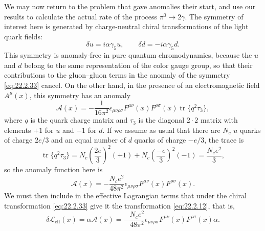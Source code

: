 We may now return to the problem that gave anomalies their start, and use
our results to calculate the actual rate of the process $\pi^0\to2\gamma$.
The symmetry of interest here is generated by charge-neutral chiral
transformations of the light quark fields:
\begin{equation}
 \delta u=i\alpha\gamma_5u,\qquad
 \delta d=-i\alpha\gamma_5d.
 \tag{22.2.33}\label{eq:22.2.33}
\end{equation}
This symmetry is anomaly-free in pure quantum chromodynamics, because the
$u$ and $d$ belong to the same representation of the color gauge group, so
that their contributions to the gluon--gluon terms in the anomaly of the
symmetry \eqref{eq:22.2.33} cancel. On the other hand, in the presence of
an electromagnetic field $A^\mu(x)$, this symmetry has an anomaly
\[
 \mathcal A(x)=-\frac{1}{16\pi^2}\epsilon_{\mu\nu\rho\sigma}
 F^{\mu\nu}(x)F^{\rho\sigma}(x)
 \operatorname{tr}\{q^2\tau_3\},
\]
where $q$ is the quark charge matrix and $\tau_3$ is the diagonal
$2\cdot2$ matrix with elements $+1$ for $u$ and $-1$ for $d$. If we
assume as usual that there are $N_c$ $u$ quarks of charge $2e/3$ and an
equal number of $d$ quarks of charge $-e/3$, the trace is
\[
 \operatorname{tr}\{q^2\tau_3\}
 =N_c\left(\frac{2e}{3}\right)^2(+1)
 +N_c\left(\frac{-e}{3}\right)^2(-1)
 =\frac{N_ce^2}{3},
\]
so the anomaly function here is
\begin{equation}
 \mathcal A(x)=-\frac{N_ce^2}{48\pi^2}
 \epsilon_{\mu\nu\rho\sigma}F^{\mu\nu}(x)F^{\rho\sigma}(x).
 \tag{22.2.34}\label{eq:22.2.34}
\end{equation}
We must then include in the effective Lagrangian terms that under the
chiral transformation \eqref{eq:22.2.33} give it the transformation
\eqref{eq:22.2.12}, that is,
\begin{equation}
 \delta\mathcal L_{\mathrm{eff}}(x)=\alpha\mathcal A(x)
 =-\frac{N_ce^2}{48\pi^2}\epsilon_{\mu\nu\rho\sigma}
 F^{\mu\nu}(x)F^{\rho\sigma}(x)\alpha.
 \tag{22.2.35}\label{eq:22.2.35}
\end{equation}

